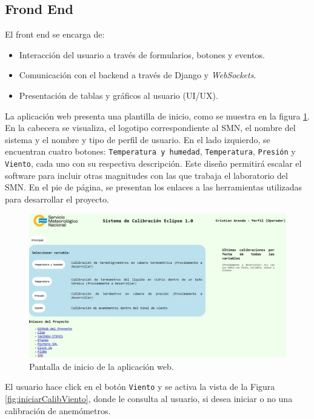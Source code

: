 \subsection{Frond End}\label{sec:frondEnd}

El front end se encarga de:
\begin{itemize}
    \item Interacción del usuario a través de formularios, botones y eventos.
    \item Comunicación con el backend a través de Django y \textit{WebSockets}.
    \item Presentación de tablas y gráficos al usuario (UI/UX).
\end{itemize}
La aplicación web presenta una plantilla de inicio, como se muestra en la figura \ref{fig:index}. En la cabecera se visualiza, el logotipo correspondiente al SMN, el nombre del sistema y el nombre y tipo de perfil de usuario. En el lado izquierdo, se encuentran cuatro botones: \texttt{Temperatura y humedad}, \texttt{Temperatura}, \texttt{Presión} y \texttt{Viento}, cada uno con su respectiva descripción. Este diseño permitirá escalar el software para incluir otras magnitudes con las que trabaja el laboratorio del SMN. En el pie de página, se presentan los enlaces a las herramientas utilizadas para desarrollar el proyecto.
\begin{figure}[H]
    \centering
    \includegraphics[width=1.1\linewidth]{Figuras/AplicacionWeb/frondend/index.jpg}
    \caption{Pantalla de inicio de la aplicación web.}
    \label{fig:index}
\end{figure}
El usuario hace click en el botón \texttt{Viento} y se activa la vista de la Figura \ref{fig:iniciarCalibViento}, donde le consulta al usuario, si desea iniciar o no una calibración de anemómetros.
